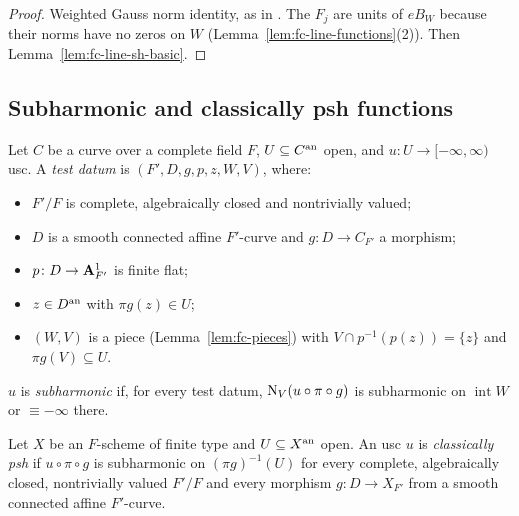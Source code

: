 \begin{proof}
Weighted Gauss norm identity, as in \cite[Lemma~5.13]{FHX}. The $F_j$ are units of $eB_W$ because their norms have no
zeros on $W$ (Lemma~\ref{lem:fc-line-functions}(2)). Then Lemma~\ref{lem:fc-line-sh-basic}.
\end{proof}

\subsection{Subharmonic and classically psh functions}\label{subsec:fc-gr25}

\begin{definition}\label{def:fc-subharmonic}
\notready
{}
Let $C$ be a curve over a complete field $F$, $U\subseteq C^{\mathrm{an}}$ open, and $u\colon U\to[-\infty,\infty)$ usc. A \emph{test datum} is
$(F',D,g,p,z,W,V)$, where:
\begin{itemize}
\item $F'/F$ is complete, algebraically closed and nontrivially valued;
\item $D$ is a smooth connected affine $F'$-curve and $g\colon D\to C_{F'}$ a morphism;
\item $p\colon D\to\mathbf{A}^1_{F'}$ is finite flat;
\item $z\in D^{\mathrm{an}}$ with $\pi g(z)\in U$;
\item $(W,V)$ is a piece (Lemma~\ref{lem:fc-pieces}) with $V\cap p^{-1}(p(z))=\{z\}$ and $\pi g(V)\subseteq U$.
\end{itemize}
$u$ is \emph{subharmonic} if, for every test datum, $\operatorname{N}_V(u\circ\pi\circ g)$ is subharmonic on $\operatorname{int}W$ or
$\equiv-\infty$ there.
\end{definition}

\begin{definition}\label{def:fc-classically-psh}
\notready
{}
Let $X$ be an $F$-scheme of finite type and $U\subseteq X^{\mathrm{an}}$ open. An usc $u$ is \emph{classically psh} if $u\circ\pi\circ g$ is
subharmonic on $(\pi g)^{-1}(U)$ for every complete, algebraically closed, nontrivially valued $F'/F$ and every morphism
$g\colon D\to X_{F'}$ from a smooth connected affine $F'$-curve.
\end{definition}

